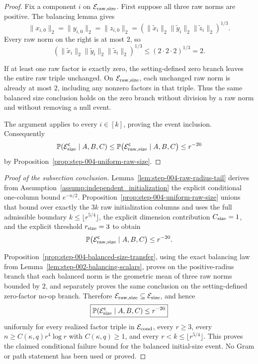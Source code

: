 \begin{proof}
Fix a component \(i\) on
\(\mathcal E_{\rm raw,size}\). First suppose all three raw norms are
positive. The balancing lemma gives
\[
  \|x_{i,0}\|_2=\|y_{i,0}\|_2=\|z_{i,0}\|_2
  =\left(\|\widetilde x_i\|_2
          \|\widetilde y_i\|_2
          \|\widetilde z_i\|_2\right)^{1/3}.
\]
Every raw norm on the right is at most \(2\), so
\[
  \left(\|\widetilde x_i\|_2
          \|\widetilde y_i\|_2
          \|\widetilde z_i\|_2\right)^{1/3}
  \le (2\cdot2\cdot2)^{1/3}=2.
\]

If at least one raw factor is exactly zero, the setting-defined zero branch
leaves the entire raw triple unchanged. On
\(\mathcal E_{\rm raw,size}\), each unchanged raw norm is already at most
\(2\), including any nonzero factors in that triple. Thus the same balanced
size conclusion holds on the zero branch without division by a raw norm and
without removing a null event.

The argument applies to every \(i\in[k]\), proving the event inclusion.
Consequently
\[
  \mathbb P\!\left(\mathcal E_{\rm size}^{\mathsf c}\mid A,B,C\right)
  \le
  \mathbb P\!\left(\mathcal E_{\rm raw,size}^{\mathsf c}\mid A,B,C\right)
  \le r^{-20}
\]
by Proposition~\ref{prop:step-004-uniform-raw-size}. 

\end{proof}

\begin{proof}[Proof of the subsection conclusion]

Lemma~\ref{lem:step-004-raw-radius-tail} derives from
Assumption~\ref{assump:independent_initialization} the explicit conditional
one-column bound \(e^{-n/2}\). Proposition~\ref{prop:step-004-uniform-raw-size}
unions that bound over exactly the \(3k\) raw initialization columns and uses
the full admissible boundary \(k\le\lfloor r^{5/4}\rfloor\), the explicit
dimension contribution \(C_{\rm size}=1\), and the explicit threshold
\(r_{\rm size}=3\) to obtain
\[
  \mathbb P\!\left(\mathcal E_{\rm raw,size}^{\mathsf c}
    \mid A,B,C\right)\le r^{-20}.
\]

Proposition~\ref{prop:step-004-balanced-size-transfer}, using the exact
balancing law from Lemma~\ref{lem:step-002-balancing-scalars}, proves on the positive-radius branch
that each balanced norm is the geometric mean of three raw norms bounded by
\(2\), and separately proves the same conclusion on the setting-defined
zero-factor no-op branch. Therefore
\(\mathcal E_{\rm raw,size}\subseteq\mathcal E_{\rm size}\), and hence
\[
  \boxed{
  \mathbb P\!\left(\mathcal E_{\rm size}^{\mathsf c}
    \mid A,B,C\right)\le r^{-20}}
\]
uniformly for every realized factor triple in \(\mathcal E_{\rm cond}\),
every \(r\ge3\), every \(n\ge C(\kappa,q)r^4\log r\) with
\(C(\kappa,q)\ge1\), and every
\(r<k\le\lfloor r^{5/4}\rfloor\). This proves the claimed conditional
failure bound for the balanced initial-size event. No Gram or path statement
has been used or proved.

\end{proof}

